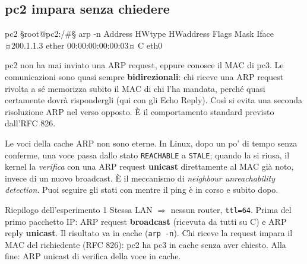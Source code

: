 \subsection{pc2 impara senza chiedere}
\begin{terminale}{pc2}
§root@pc2:/#§ arp -n
Address        HWtype  HWaddress            Flags Mask  Iface
¤200.1.1.3      ether   00:00:00:00:00:03¤    C           eth0
\end{terminale}
\begin{intuizione}
pc2 non ha mai inviato una ARP request, eppure conosce il MAC di pc3. Le comunicazioni sono quasi sempre \textbf{bidirezionali}: chi riceve una ARP request rivolta a sé memorizza subito il MAC di chi l'ha mandata, perché quasi certamente dovrà rispondergli (qui con gli Echo Reply). Così si evita una seconda risoluzione ARP nel verso opposto. È il comportamento standard previsto dall'RFC 826.
\end{intuizione}
\begin{mlbox}
Le voci della cache ARP non sono eterne. In Linux, dopo un po' di tempo senza conferme, una voce passa dallo stato \texttt{REACHABLE} a \texttt{STALE}; quando la si riusa, il kernel la \emph{verifica} con una ARP request \textbf{unicast} direttamente al MAC già noto, invece di un nuovo broadcast. È il meccanismo di \emph{neighbour unreachability detection}. Puoi seguire gli stati con  mentre il ping è in corso e subito dopo.
\end{mlbox}

\begin{appunti}{Riepilogo dell'esperimento 1}
Stessa LAN $\Rightarrow$ nessun router, \texttt{ttl=64}. Prima del primo pacchetto IP: ARP request \textbf{broadcast} (ricevuta da tutti su C) e ARP reply \textbf{unicast}. Il risultato va in cache (\texttt{arp -n}). Chi riceve la request impara il MAC del richiedente (RFC 826): pc2 ha pc3 in cache senza aver chiesto. Alla fine: ARP unicast di verifica della voce in cache.
\end{appunti}
